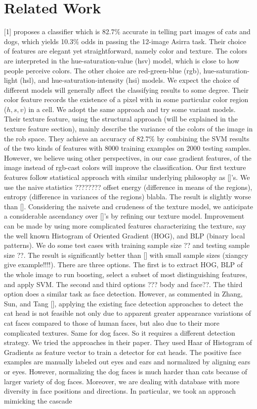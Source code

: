 \documentclass[12pt]{article}
\begin{document}
\section{Related Work}
 [1] proposes a classifier which is 82.7$\%$ accurate in telling part images of cats and dogs, which yields 10.3$\%$ odds in passing the 12-image Asirra task. Their choice of features are elegant yet straightforward, namely color and texture. The colors are interpreted in the hue-saturation-value (hsv) model, which is close to how people perceive colors. The other choice are red-green-blue (rgb), hue-saturation-light (hsl), and hue-saturation-intensity (hsi) models. We expect the choice of different models will generally affect the classifying results to some degree. Their color feature records the existence of a pixel with in some particular color region ($h,s,v$) in a cell. We adopt the same approach and try some variant models. Their texture feature, using the structural approach (will be explained in the texture feature section), mainly describe the variance of the colors of the image in the rob space. They achieve an accuracy of 82.7$\%$ by combining the SVM results of the two kinds of features with 8000 training examples on 2000 testing samples. However, we believe using other perspectives, in our case gradient features, of the image instead of rgb-cast colors will improve the classification. Our first texture features follow statistical approach with similar underlying philosophy as []'s. We use the naive statistics ???????? offset energy (difference in means of the regions), entropy (difference in variances of the regions) blabla. The result is slightly worse than []. Considering the naivete and crudeness of the texture model, we anticipate a considerable ascendancy over []'s by refining our texture model. Improvement can be made by using more complicated features characterizing the texture, say the well known Histogram of Oriented Gradient (HOG), and BLP (binary local patterns). We do some test cases with training sample size ?? and testing sample size ??. The result is significantly better than [] with small sample sizes (xiangcy give example!!!!). There are three options. The first is to extract HOG, BLP of the whole image to run boosting, select a subset of most distinguishing features, and apply SVM. The second and third options ??? body and face??. The third option does a similar task as face detection. However, as commented in Zhang, Sun, and Tang [], applying the existing face detection approaches to detect the cat head is not feasible not only due to apparent greater appearance variations of cat faces compared to those of human faces, but also due to their more complicated textures. Same for dog faces. So it requires a different detection strategy. We tried the approaches in their paper. They used Haar of Histogram of Gradients as feature vector to train a detector for cat heads. The positive face examples are manually labeled out eyes and ears and normalized by aligning ears or eyes. However, normalizing the dog faces is much harder than cats because of larger variety of dog faces. Moreover, we are dealing with database with more diversity in face positions and directions. In particular, we took an approach mimicking the cascade 
\end{document}
